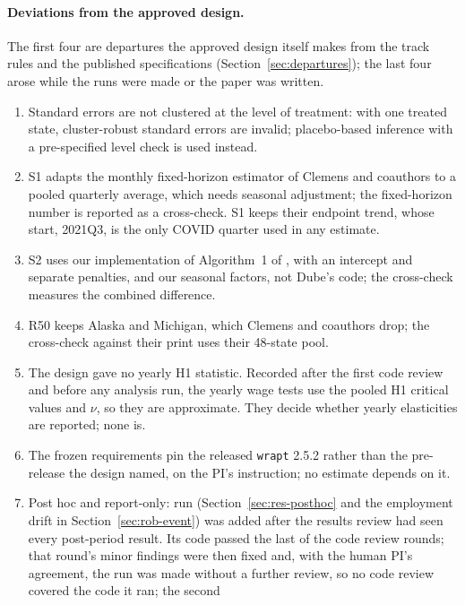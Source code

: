 \paragraph{Deviations from the approved design.} The first four are departures the approved design
itself makes from the track rules and the published specifications (Section~\ref{sec:departures});
the last four arose while the runs were made or the paper was written.
\begin{enumerate}
  \item[D1.] Standard errors are not clustered at the level of treatment: with one treated state,
        cluster-robust standard errors are invalid; placebo-based inference with a pre-specified
        level check is used instead.
  \item[D2.] S1 adapts the monthly fixed-horizon estimator of Clemens and coauthors to a pooled
        quarterly average, which needs seasonal adjustment; the fixed-horizon number is reported as a
        cross-check. S1 keeps their endpoint trend, whose start, 2021Q3, is the only COVID quarter
        used in any estimate.
  \item[D3.] S2 uses our implementation of Algorithm~1 of \citet{arkhangelsky2021synthetic}, with an
        intercept and separate penalties, and our seasonal factors, not Dube's code; the cross-check
        measures the combined difference.
  \item[D4.] R50 keeps Alaska and Michigan, which Clemens and coauthors drop; the cross-check against
        their print uses their 48-state pool.
  \item[D5.] The design gave no yearly H1 statistic. Recorded after the first code review and before
        any analysis run, the yearly wage tests use the pooled H1 critical values and $\nu$, so they
        are approximate. They decide whether yearly elasticities are reported; none is.
  \item[D6.] The frozen requirements pin the released \texttt{wrapt} 2.5.2 rather than the
        pre-release the design named, on the PI's instruction; no estimate depends on it.
  \item[D7.] Post hoc and report-only: run  (Section~\ref{sec:res-posthoc} and the
        employment drift in Section~\ref{sec:rob-event}) was added after the results review had
        seen every post-period result. Its code passed the last of the \CrewRoundsCode{} code review
        rounds; that round's minor findings were then fixed and, with the human PI's agreement, the
        run was made without a further review, so no code review covered the code it ran; the second

\end{enumerate}
